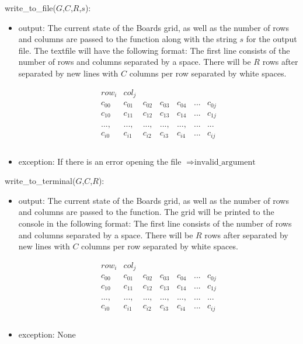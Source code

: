 \documentclass[12pt]{article}
\begin{document}
\noindent write\_to\_file($G$,$C$,$R$,$s$):
\begin{itemize}
\item output: The current state of the Boards grid, as well as the number of rows and columns are passed to the function along with the string $s$ for the output file. The textfile will have the following format: The first line consists of the number of rows and columns separated by a space. There will be $R$ rows after separated by new lines with $C$ columns per row separated by white spaces.

  \begin{equation}
    \begin{array}{ccccccc}
      row_i & col_j &  &  &  & &  \\
      c_{00} & c_{01} & c_{02} & c_{03} & c_{04} & ... & c_{0j}\\
      c_{10} & c_{11} & c_{12} & c_{13} & c_{14} & ... & c_{1j}\\
      \\
      ..., & ..., & ..., & ..., & ..., & ... & ...
      \\
      c_{i0} & c_{i1} & c_{i2} & c_{i3} & c_{i4} & ... & c_{ij}\\ \\
    \end{array}
  \end{equation}

\item exception: If there is an error opening the file $\Rightarrow \text{invalid\_argument}$
\end{itemize}


\noindent write\_to\_terminal($G$,$C$,$R$):
\begin{itemize}
\item output: The current state of the Boards grid, as well as the number of rows and columns are passed to the function. The grid will be printed to the console in the following format: The first line consists of the number of rows and columns separated by a space. There will be $R$ rows after separated by new lines with $C$ columns per row separated by white spaces.

  \begin{equation}
    \begin{array}{ccccccc}
      row_i & col_j &  &  &  & &  \\
      c_{00} & c_{01} & c_{02} & c_{03} & c_{04} & ... & c_{0j}\\
      c_{10} & c_{11} & c_{12} & c_{13} & c_{14} & ... & c_{1j}\\
      \\
      ..., & ..., & ..., & ..., & ..., & ... & ...
      \\
      c_{i0} & c_{i1} & c_{i2} & c_{i3} & c_{i4} & ... & c_{ij}\\ \\
    \end{array}
  \end{equation}

\item exception: None
\end{itemize}
\end{document}
